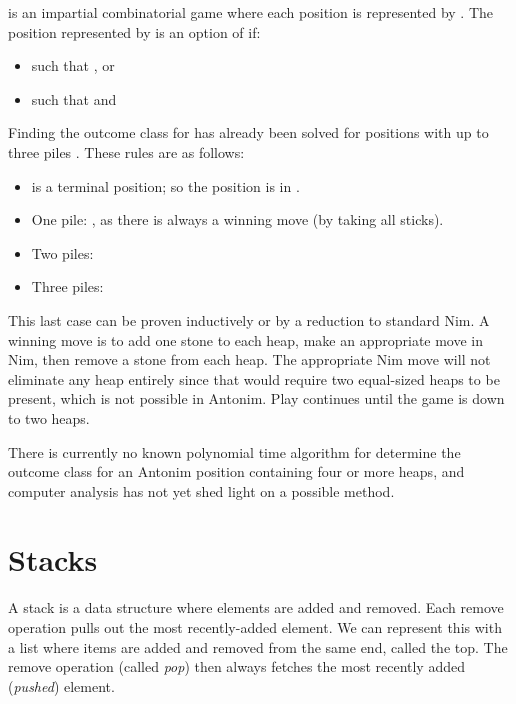 \documentclass[letter,10pt]{article}
\begin{document}
\begin{definition}[Antonim]
	\label{def:antonim}
	 is an impartial combinatorial game where each position is represented by .  The position represented by  is an option of  if:
	\begin{itemize}
		\item  such that , or
		\item  such that  and 
	\end{itemize} 
\end{definition}

Finding the outcome class for   has already been solved for positions with up to three piles \cite{WinningWays:2001}.  These rules are as follows:

\begin{itemize}
    \item  is a terminal position; so the position is in .
    \item One pile: , as there is always a winning move (by taking all sticks).
    \item Two piles: 
    \item Three piles: 
\end{itemize}

This last case can be proven inductively or by a reduction to standard Nim. A winning move is to add one stone to each heap, make an appropriate move in Nim, then remove a stone from each heap. The appropriate Nim move will not eliminate any heap entirely since that would require two equal-sized heaps to be present, which is not possible in Antonim. Play continues until the game is down to two heaps.










There is currently no known polynomial time algorithm for determine the outcome class for an Antonim position containing four or more heaps, and computer analysis has not yet shed light on a possible method.

\section{Stacks}
\label{section:stacks}

A stack is a data structure where elements are added and removed.  Each remove operation pulls out the most recently-added element.  We can represent this with a list where items are added and removed from the same end, called the top.  The remove operation (called \emph{pop}) then always fetches the most recently added (\emph{pushed}) element.
\end{document}
